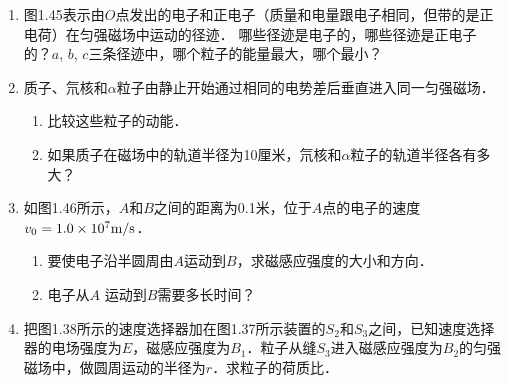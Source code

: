 \begin{enumerate}
\begin{figure}[htp]
\begin{minipage}[t]{0.48\textwidth}
\caption{}
\end{minipage}
\end{figure}



\begin{solution}

\end{solution}


\item 图1.45表示由$O$点发出的电子和正电子（质量和电量跟电子相同，但带的是正电荷）在匀强磁场中运动的径迹．
哪些径迹是电子的，哪些径迹是正电子的？$a$, $b$, $c$三条径迹中，哪个粒子的能量最大，哪个最小？


\begin{solution}

\end{solution}

\item 质子、氘核和$\alpha$粒子由静止开始通过相同的电势差后垂直进入同一匀强磁场．
\begin{enumerate}
    \item 比较这些粒子的动能．
    \item 如果质子在磁场中的轨道半径为10厘米，氘核和$\alpha$粒子的轨道半径各有多大？
\end{enumerate}


\begin{solution}

\end{solution}

\item 如图1.46所示，$A$和$B$之间的距离为0.1米，位于$A$点的电子的速度$v_0=1.0\times10^7\text{m}/\text{s}$．
\begin{enumerate}
    \item 要使电子沿半圆周由$A$运动到$B$，求磁感应强度的大小和方向．
    \item 电子从$A$
运动到$B$需要多长时间？
\end{enumerate}


\begin{solution}

\end{solution}

\item 把图1.38所示的速度选择器加在图1.37所示装置的$S_2$和$S_3$之间，已知速度选择器的电场强度为$E$，磁感应强度为$B_1$．粒子从缝$S_3$进入磁感应强度为$B_2$的匀强磁场中，做圆周运动的半径为$r$．求粒子的荷质比．



\end{enumerate}
